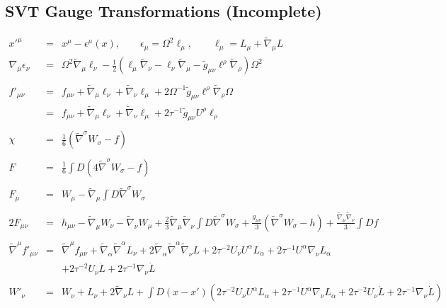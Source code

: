 \documentclass[10pt,letterpaper]{article}
\numberwithin{equation}{section}
\begin{document}
\begin{appendices}
\section{SVT Gauge Transformations (Incomplete)}
\begin{eqnarray}
x'^\mu &=& x^\mu - \epsilon^\mu(x),\qquad \epsilon_\mu = \Omega^2\ell_\mu,\qquad \ell_\mu = L_\mu + \tilde\nabla_\mu L
\\ \nonumber
\nabla_\mu \epsilon_\nu &=& \Omega^2 \tilde\nabla_\mu \ell_\nu - \frac12 \left(
\ell_\mu \tilde\nabla_\nu - \ell_\nu \tilde\nabla_\mu - \tilde g_{\mu\nu} \ell^\rho \tilde\nabla_\rho\right)\Omega^2
\\ \nonumber\\
f'_{\mu\nu} &=& f_{\mu\nu} + \tilde\nabla_\mu \ell_\nu +\tilde\nabla_\nu \ell_\mu + 2\Omega^{-1} \tilde g_{\mu\nu} \ell^\rho \tilde\nabla_\rho \Omega
\nonumber\\
&=& f_{\mu\nu} + \tilde\nabla_\mu \ell_\nu +\tilde\nabla_\nu \ell_\mu + 2\tau^{-1} \tilde g_{\mu\nu}U^\rho \ell_\rho
\\ \nonumber\\
\chi &=& \frac{1}{6} \left( \tilde\nabla^\sigma W_\sigma - f\right)
\\ \nonumber\\
F &=& \frac{1}{6} \int D(4\tilde\nabla^\sigma W_\sigma -f)
\\ \nonumber\\
F_\mu &=& W_\mu -\tilde\nabla_\mu \int D \tilde\nabla^\sigma W_\sigma
\\ \nonumber\\
2F_{\mu\nu} &=& h_{\mu\nu} - \tilde\nabla_\mu W_\nu -\tilde\nabla_\nu W_\mu + \frac23 \tilde\nabla_\mu\tilde\nabla_\nu \int D \tilde\nabla^\sigma W_\sigma
+\frac{g_{\mu\nu}}{3} (\tilde\nabla^\sigma W_\sigma -h) + \frac{\tilde\nabla_\mu\tilde\nabla_\nu}{3}\int D f 
\\ \nonumber\\ 
\tilde\nabla^\mu f'_{\mu\nu} &=& \tilde\nabla^\mu f_{\mu\nu} + \tilde\nabla_\alpha\tilde\nabla^\alpha L_\nu + 2\tilde\nabla_\alpha\tilde\nabla^\alpha \tilde\nabla_\nu L +
2  \tau^{-2}  U_{\nu}U^{\alpha}L_\alpha + 2 \tau^{-1} U^{\alpha}\nabla_{\nu}L_{\alpha}
\nonumber\\
&&+  2  \tau^{-2}  U_{\nu}\dot L + 2 \tau^{-1}\nabla_{\nu}\dot L
\\ \nonumber\\
W'_\nu &=& W_\nu +L_\nu + 2\tilde\nabla_\nu L + \int D(x-x') (2  \tau^{-2}  U_{\nu}U^{\alpha}L_\alpha + 2 \tau^{-1} U^{\alpha}\nabla_{\nu}L_{\alpha}+ 2  \tau^{-2}  U_{\nu}\dot L + 2 \tau^{-1}\nabla_{\nu}\dot L)
\end{eqnarray}
\end{appendices}
\end{document}
